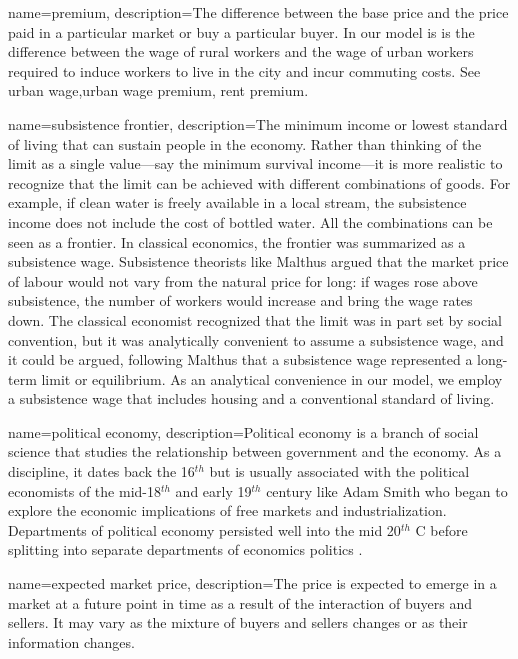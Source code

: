 {
name=premium,
description={The difference between the base price and the price paid in a particular market or buy a particular buyer. In our model is is the difference between the wage of rural workers and the wage of urban workers required to induce workers to live in the city and incur commuting costs. See \gls{urban wage},\gls{urban wage premium}, \gls{rent premium}.}
}

{
name=subsistence frontier,
description={The minimum income or lowest standard of living that can sustain people in the economy. Rather than thinking of the limit as a single value---say the minimum survival income---it is more realistic to recognize that the limit can be achieved with different combinations of goods. For example, if clean water is freely available in a local stream, the subsistence income does not include the cost of bottled water. All the combinations can be seen as a \gls{frontier}. \newline In classical economics, the frontier was summarized as a subsistence wage. Subsistence theorists like Malthus argued that the market price of labour would not vary from the natural price for long: if wages rose above subsistence, the number of workers would increase and bring the wage rates down. The classical economist recognized that the limit was in part set by social convention, but it was analytically convenient to assume a subsistence wage, and it could be argued, following Malthus that a subsistence wage  represented a long-term limit or \gls{equilibrium}. As an analytical convenience in our model, we employ a subsistence wage that includes housing and a conventional standard of living.  }
}

{
name=political economy,
description={Political economy is a branch of social science that studies the relationship  between government and the economy. As a discipline, it dates back the  16$^{th}$ but is usually associated with the political economists of the mid-18$^{th}$ and  early 19$^{th}$  century like Adam Smith who began to explore the economic implications of free markets and industrialization. Departments of political economy persisted well into the mid 20$^{th}$ C before splitting into separate departments of economics politics \cite{helleiner20PoliticalEconomy2018}.}
}

{
name=expected market price,
description={The price is expected to emerge in a \gls{market} at a future point in time as a result of the interaction of buyers and sellers. It may vary as the mixture of buyers and sellers changes or as their information changes.}
}

